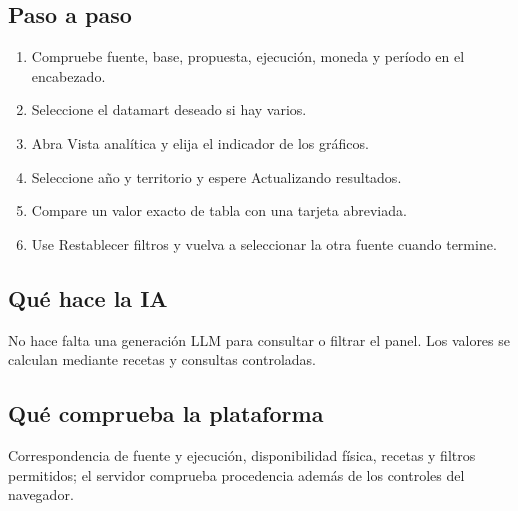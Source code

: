\subsection{Paso a paso}
\begin{enumerate}
\item Compruebe fuente, base, propuesta, ejecución, moneda y período en el encabezado.\par\nopagebreak[4]
\item Seleccione el datamart deseado si hay varios.\par\nopagebreak[4]
\item Abra Vista analítica y elija el indicador de los gráficos.\par\nopagebreak[4]
\item Seleccione año y territorio y espere Actualizando resultados.\par\nopagebreak[4]
\item Compare un valor exacto de tabla con una tarjeta abreviada.\par\nopagebreak[4]
\item Use Restablecer filtros y vuelva a seleccionar la otra fuente cuando termine.\par\nopagebreak[4]
\end{enumerate}
\subsection{Qué hace la IA}
No hace falta una generación LLM para consultar o filtrar el panel. Los valores se calculan mediante recetas y consultas controladas.

\subsection{Qué comprueba la plataforma}
Correspondencia de fuente y ejecución, disponibilidad física, recetas y filtros permitidos; el servidor comprueba procedencia además de los controles del navegador.

